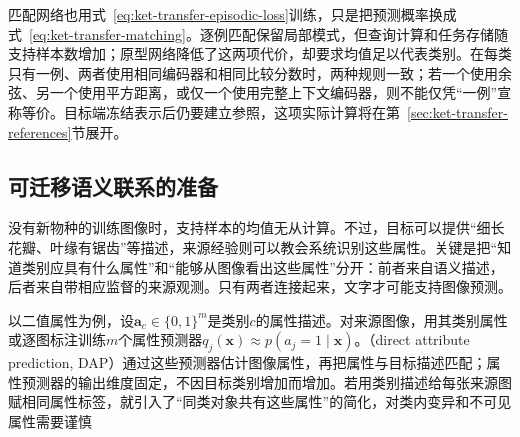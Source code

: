 匹配网络也用式~\eqref{eq:ket-transfer-episodic-loss}训练，只是把预测概率换成式~\eqref{eq:ket-transfer-matching}。逐例匹配保留局部模式，但查询计算和任务存储随支持样本数增加；原型网络降低了这两项代价，却要求均值足以代表类别。在每类只有一例、两者使用相同编码器和相同比较分数时，两种规则一致；若一个使用余弦、另一个使用平方距离，或仅一个使用完整上下文编码器，则不能仅凭“一例”宣称等价。目标端冻结表示后仍要建立参照，这项实际计算将在第~\ref{sec:ket-transfer-references}节展开。

\subsection{可迁移语义联系的准备}
\label{sec:ket-transfer-semantic-preparation}

没有新物种的训练图像时，支持样本的均值无从计算。不过，目标可以提供“细长花瓣、叶缘有锯齿”等描述，来源经验则可以教会系统识别这些属性。关键是把“知道类别应具有什么属性”和“能够从图像看出这些属性”分开：前者来自语义描述，后者来自带相应监督的来源观测。只有两者连接起来，文字才可能支持图像预测。

以二值属性为例，设$\bm a_c\in\{0,1\}^m$是类别$c$的属性描述。对来源图像，用其类别属性或逐图标注训练$m$个属性预测器$q_j(\bm x)\approx p(a_j=1\mid\bm x)$。（direct attribute prediction, DAP）通过这些预测器估计图像属性，再把属性与目标描述匹配；属性预测器的输出维度固定，不因目标类别增加而增加。若用类别描述给每张来源图赋相同属性标签，就引入了“同类对象共有这些属性”的简化，对类内变异和不可见属性需要谨慎

